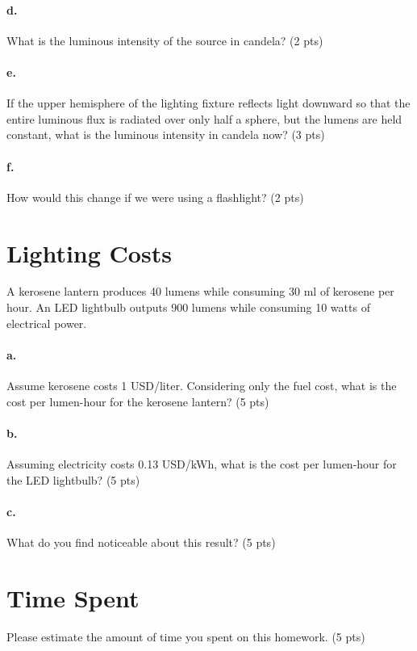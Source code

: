 \documentclass{article}
\begin{document}
\paragraph{d.} What is the luminous intensity of the source in candela? (2 pts)

\paragraph{e.} If the upper hemisphere of the lighting fixture reflects light
downward so that the entire luminous flux is radiated over only half a
sphere, but the lumens are held constant, what is the luminous intensity
in candela now? (3 pts)

\paragraph{f.} How would this change if we were using a flashlight? (2 pts)


\section{Lighting Costs}

A kerosene lantern produces 40 lumens while consuming 30 ml of kerosene
per hour.  An LED lightbulb outputs 900 lumens while consuming 10 watts
of electrical power.

\paragraph{a.} Assume kerosene costs 1 USD/liter.  Considering only the fuel cost,
what is the cost per lumen-hour for the kerosene lantern? (5 pts)

\paragraph{b.} Assuming electricity costs 0.13 USD/kWh, what is the cost per
lumen-hour for the LED lightbulb? (5 pts)

\paragraph{c.} What do you find noticeable about this result? (5 pts)


\section{Time Spent}

Please estimate the amount of time you spent on this homework. (5 pts)
\end{document}
